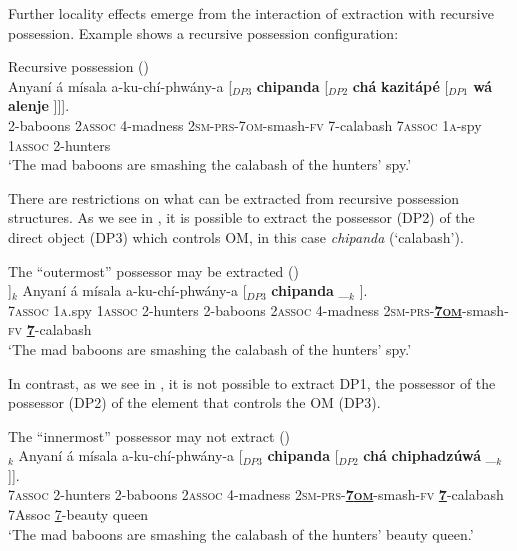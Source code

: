\documentclass[output=paper,colorlinks,citecolor=brown]{langscibook}
\begin{document}
Further locality effects emerge from the interaction of extraction with recursive possession. Example  shows a recursive possession configuration:

\ea%
    \label{ex:branan:14}
    Recursive possession \hfill{(\citealt[60, ex. 29]{Mchombo2004})}\\
    \gll    Anyaní á mísala a-ku-chí-phwány-a [$_{DP3}$ \textbf{chipanda}  [$_{DP2}$ \textbf{chá}  \textbf{kazitápé} [$_{DP1}$ \textbf{wá} \textbf{alenje} ]]]. \\
            2-baboons 2\textsc{assoc} 4-madness 2\textsc{sm-prs}-7\textsc{om}-smash-\textsc{fv} {} 7-calabash {} 7\textsc{assoc} 1\textsc{a}-spy {} 1\textsc{assoc} 2-hunters  \\
    \glt    `The mad baboons are smashing the calabash of the hunters’ spy.'
\z

There are restrictions on what can be extracted from recursive possession structures. As we see in , it is possible to extract the possessor (DP2) of the direct object (DP3) which controls OM, in this case \emph{chipanda} (`calabash').

\ea%
    \label{ex:branan:15}
    The “outermost” possessor may be extracted \hfill{(\citealt[60, ex. 30a]{Mchombo2004})}\\
    \gll    [$_{DP2}$ \textbf{Chá}  \textbf{kazitápé} [$_{DP1}$ \textbf{wá} \textbf{alenje} ]]$_{k}$ Anyaní á mísala a-ku-chí-phwány-a [$_{DP3}$ \textbf{chipanda}   \_$_{k}$ ].  \\
            {} 7\textsc{assoc} 1\textsc{a}.spy {} 1\textsc{assoc} 2-hunters {}  2-baboons 2\textsc{assoc} 4-madness 2\textsc{sm-prs}-\textbf{\underline{7\textsc{om}}}-smash-\textsc{fv} {} \textbf{\underline{7}}-calabash   \\
    \glt    `The mad baboons are smashing the calabash of the hunters’ spy.'
\z

In contrast, as we see in , it is not possible to extract DP1, the possessor of the possessor (DP2) of the element that controls the OM (DP3).

\ea%
    \label{ex:branan:16}
    The “innermost” possessor may not extract \hfill{(\citealt[61, ex. 32]{Mchombo2004})}\\
    $_{k}$  Anyaní á mísala a-ku-chí-phwány-a [$_{DP3}$ \textbf{chipanda}  [$_{DP2}$ \textbf{chá}  \textbf{chiphadz\'{u}w\'{a}} \_$_{k}$]].\\
    {} {} 7\textsc{assoc} 2-hunters   2-baboons 2\textsc{assoc} 4-madness 2\textsc{sm-prs}-\textbf{\underline{7\textsc{om}}}-smash-\textsc{fv} {} \textbf{\underline{7}}-calabash {} 7Assoc {\underline{7}-beauty queen}\\
    \glt    `The mad baboons are smashing the calabash of the hunters’ beauty queen.'
\z
\end{document}
